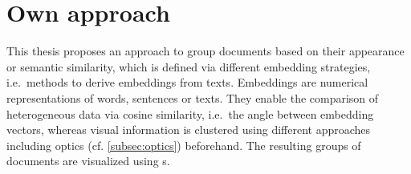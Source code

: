 \section{Own approach}\label{sec:own_approach}

This thesis proposes an approach to group documents based on their appearance or semantic similarity, 
which is defined via different embedding strategies, i.e.\ methods to derive embeddings from texts.
Embeddings are numerical representations of words, sentences or texts.
They enable the comparison of heterogeneous data via cosine similarity, i.e.\ the angle between embedding vectors, 
whereas visual information is clustered using different approaches including \acs*{optics} (cf. \autoref{subsec:optics}) beforehand.
The resulting groups of documents are visualized using \wordcloud{}s.
